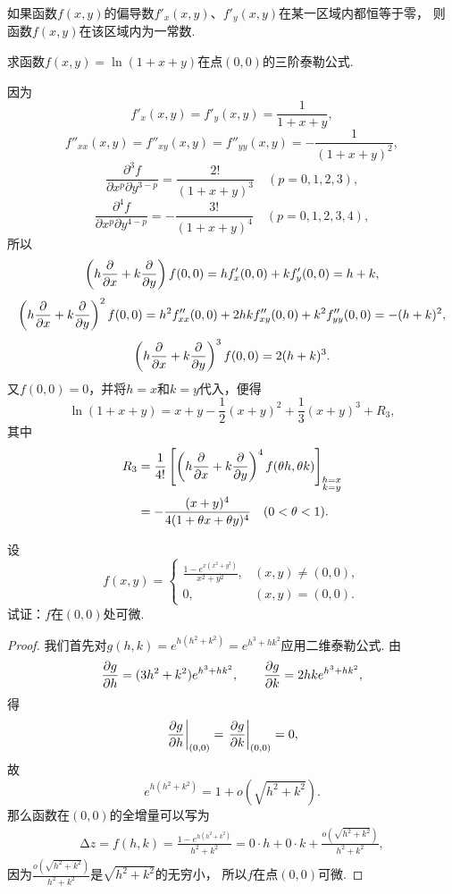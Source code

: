 如果函数\(f(x,y)\)的偏导数\(f'_x(x,y)\)、\(f'_y(x,y)\)在某一区域内都恒等于零，
则函数\(f(x,y)\)在该区域内为一常数.

\begin{example}
求函数\(f(x,y) = \ln(1+x+y)\)在点\((0,0)\)的三阶泰勒公式.
\begin{solution}
\def\oprt#1{\left(h\pdv{x}+k\pdv{y}\right)\ifx\relax#1\relax\else^{#1}\fi}
因为\[
f'_x(x,y) = f'_y(x,y) = \frac{1}{1+x+y},
\]\[
f''_{xx}(x,y) = f''_{xy}(x,y) = f''_{yy}(x,y) = -\frac{1}{(1+x+y)^2},
\]\[
\frac{\partial^3 f}{\partial x^p \partial y^{3-p}}
= \frac{2!}{(1+x+y)^3}
\quad(p=0,1,2,3),
\]\[
\frac{\partial^4 f}{\partial x^p \partial y^{4-p}}
= -\frac{3!}{(1+x+y)^4}
\quad(p=0,1,2,3,4),
\]所以\[
\oprt{} f(0,0) = h f'_x(0,0) + k f'_y(0,0) = h+k,
\]\[
\oprt{2} f(0,0) = h^2 f''_{xx}(0,0) + 2hk f''_{xy}(0,0) + k^2 f''_{yy}(0,0) = -(h+k)^2,
\]\[
\oprt{3} f(0,0) = 2(h+k)^3.
\]又\(f(0,0)=0\)，并将\(h=x\)和\(k=y\)代入，便得\[
\ln(1+x+y) = x+y-\frac{1}{2}(x+y)^2+\frac{1}{3}(x+y)^3+R_3,
\]其中\begin{align*}
R_3
&= \frac{1}{4!} \left[\oprt{4} f(\theta h,\theta k)\right]_{\substack{h=x\\k=y}} \\
&= -\frac{(x+y)^4}{4(1+\theta x+\theta y)^4}
\quad(0<\theta<1).
\end{align*}
\end{solution}
\end{example}

\begin{example}
\def\ev#1{\eval{#1}_{(0,0)}}%
设\[
f(x,y) = \begin{cases}
\frac{1 - e^{x(x^2+y^2)}}{x^2+y^2}, & (x,y)\neq(0,0), \\
0, & (x,y)=(0,0).
\end{cases}
\]试证：\(f\)在\((0,0)\)处可微.
\begin{proof}
我们首先对\(g(h,k) = e^{h(h^2+k^2)} = e^{h^3+hk^2}\)应用二维泰勒公式.
由\[
\pdv{g}{h} = (3h^2+k^2)e^{h^3+hk^2}, \qquad
\pdv{g}{k} = 2hke^{h^3+hk^2},
\]得\[
\ev{\pdv{g}{h}} = \ev{\pdv{g}{k}} = 0,
\]故\[
e^{h(h^2+k^2)} = 1 + o(\sqrt{h^2+k^2}).
\]
那么函数在\((0,0)\)的全增量可以写为
\begin{align*}
\increment z = f(h,k) = \frac{1 - e^{h(h^2+k^2)}}{h^2+k^2}
= 0 \cdot h + 0 \cdot k + \frac{o(\sqrt{h^2+k^2})}{h^2+k^2},
\end{align*}
因为\(\frac{o(\sqrt{h^2+k^2})}{h^2+k^2}\)是\(\sqrt{h^2+k^2}\)的无穷小，
所以\(f\)在点\((0,0)\)可微.
\end{proof}
\end{example}

